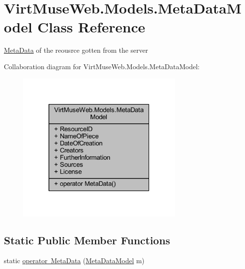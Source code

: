 \hypertarget{class_virt_muse_web_1_1_models_1_1_meta_data_model}{}\section{Virt\+Muse\+Web.\+Models.\+Meta\+Data\+Model Class Reference}
\label{class_virt_muse_web_1_1_models_1_1_meta_data_model}


\mbox{\hyperlink{class_meta_data}{Meta\+Data}} of the reousrce gotten from the server  




Collaboration diagram for Virt\+Muse\+Web.\+Models.\+Meta\+Data\+Model\+:
\nopagebreak
\begin{figure}[H]
\begin{center}
\leavevmode
\includegraphics[width=235pt]{class_virt_muse_web_1_1_models_1_1_meta_data_model__coll__graph}
\end{center}
\end{figure}
\subsection*{Static Public Member Functions}
\begin{DoxyCompactItemize}
\item 
static \mbox{\hyperlink{class_virt_muse_web_1_1_models_1_1_meta_data_model_a4a2ab308d80d527632efc545964d718a}{operator Meta\+Data}} (\mbox{\hyperlink{class_virt_muse_web_1_1_models_1_1_meta_data_model}{Meta\+Data\+Model}} m)
\end{DoxyCompactItemize}
